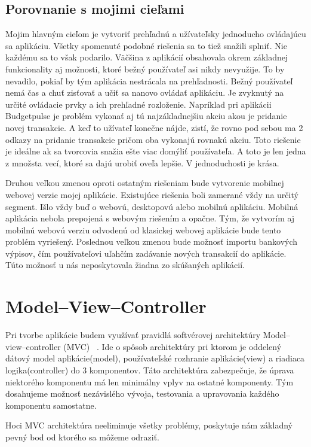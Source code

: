 \documentclass[12pt,onesided]{book}
\begin{document}
\subsection{Porovnanie s mojimi cieľami}
Mojim hlavným cieľom je vytvoriť prehľadnú a užívateľsky jednoducho ovládajúcu sa aplikáciu. Všetky spomenuté podobné riešenia sa to tiež snažili splniť. Nie každému sa to však podarilo. Väčšina z aplikácií obsahovala okrem základnej funkcionality aj možnosti, ktoré bežný používateľ asi nikdy nevyužije. To by nevadilo, pokiaľ by tým aplikácia nestrácala na prehľadnosti. Bežný používateľ nemá čas a chuť zisťovať a učiť sa nanovo ovládať aplikáciu. Je zvyknutý na určité ovládacie prvky a ich prehľadné rozloženie. Napríklad pri aplikácii Budgetpulse je problém vykonať aj tú najzákladnejšiu akciu akou je pridanie novej transakcie. A keď to užívateľ konečne nájde, zistí, že rovno pod sebou ma 2 odkazy na pridanie transakcie pričom oba vykonajú rovnakú akciu. Toto riešenie je ideálne ak sa tvorcovia snažia ešte viac domýliť používateľa. A toto je len jedna z množsta vecí, ktoré sa dajú urobiť oveľa lepšie. V jednoduchosti je krása.

Druhou veľkou zmenou oproti ostatným riešeniam bude vytvorenie mobilnej webovej verzie mojej aplikácie. Existujúce riešenia boli zamerané vždy na určitý segment. Išlo vždy buď o webovú, desktopovú alebo mobilnú aplikáciu. Mobilná aplikácia nebola prepojená s webovým riešením a opačne. Tým, že vytvorím aj mobilnú webovú verziu odvodenú od klasickej webovej aplikácie bude tento problém vyriešený. Poslednou veľkou zmenou bude možnosť importu bankových výpisov, čím používateľovi uľahčím zadávanie nových transakcií do aplikácie. Túto možnosť u nás neposkytovala žiadna zo skúšaných aplikácií.

\section{Model–View–Controller}
Pri tvorbe aplikácie budem využívať pravidlá softvérovej architektúry Model–view–controller (MVC) \cite{MVCdevbook}\ . Ide o spôsob architektúry pri ktorom je oddelený dátový model aplikácie(model), používateľské rozhranie aplikácie(view) a riadiaca logika(controller) do 3 komponentov. Táto architektúra zabezpečuje, že úprava niektorého komponentu má len minimálny vplyv na ostatné komponenty. Tým dosahujeme možnosť nezávislého vývoja, testovania a upravovania každého komponentu samostatne.

Hoci MVC architektúra neeliminuje všetky problémy, poskytuje nám základný pevný bod od ktorého sa môžeme odraziť.
\end{document}
